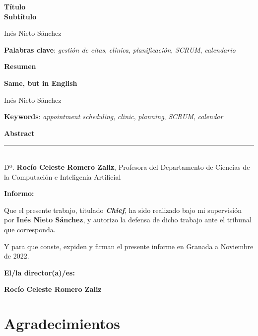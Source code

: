 \thispagestyle{empty}

\begin{center}
{\large\bfseries Título \\ Subtítulo }\\
\end{center}
\begin{center}
Inés Nieto Sánchez\\
\end{center}


\vspace{0.5cm}
\noindent\textbf{Palabras clave}: \textit{gestión de citas}, \textit{clínica}, \textit{planificación}, \textit{SCRUM}, \textit{calendario}
\vspace{0.7cm}

\noindent\textbf{Resumen}\\
	

\cleardoublepage

\begin{center}
	{\large\bfseries Same, but in English}\\
\end{center}
\begin{center}
	Inés Nieto Sánchez\\
\end{center}
\vspace{0.5cm}
\noindent\textbf{Keywords}: \textit{appointment scheduling}, \textit{clinic}, \textit{planning}, \textit{SCRUM}, \textit{calendar} 
\vspace{0.7cm}

\noindent\textbf{Abstract}\\


\cleardoublepage

\thispagestyle{empty}

\noindent\rule[-1ex]{\textwidth}{2pt}\\[4.5ex]

Dª. \textbf{Rocío Celeste Romero Zaliz}, Profesora del Departamento de Ciencias de la Computación e Inteligenia Artificial

\vspace{0.5cm}

\textbf{Informo:}

\vspace{0.5cm}

Que el presente trabajo, titulado \textit{\textbf{Chief}},
ha sido realizado bajo mi supervisión por \textbf{Inés Nieto Sánchez}, y autorizo la defensa de dicho trabajo ante el tribunal
que corresponda.

\vspace{0.5cm}

Y para que conste, expiden y firman el presente informe en Granada a Noviembre de 2022.

\vspace{1cm}

\textbf{El/la director(a)/es: }

\vspace{5cm}

\noindent \textbf{Rocío Celeste Romero Zaliz}

\chapter*{Agradecimientos}




